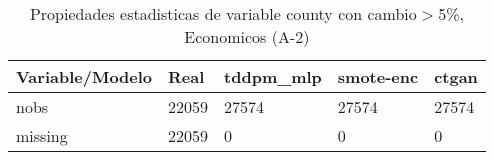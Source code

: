 \begin{table}[H]
\centering
\fontsize{8}{14}\selectfont
\caption{Propiedades estadisticas de variable county con cambio\ensuremath{>}5\%, Economicos (A-2)}
\label{table-stats-economicos-a-2-county-short}
\begin{tabular}{|l|m{10em}|m{10em}|m{10em}|m{10em}|}
\hline
 \rowcolor[gray]{0.8}
Variable/Modelo & Real & tddpm\_mlp & smote-enc & ctgan \\
\hline nobs & 22059 & 27574 & 27574 & 27574 \\
\hline missing & 22059 & 0 & 0 & 0 \\
\hline
\end{tabular}
\end{table}

